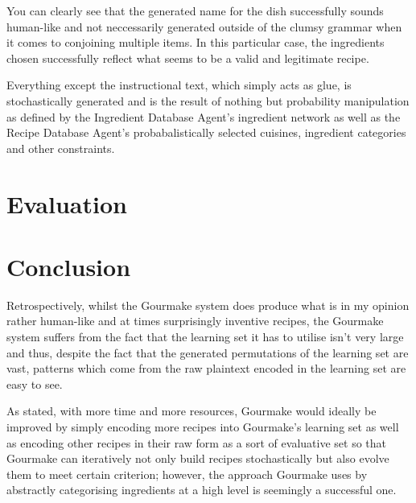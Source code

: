 \documentclass[9pt,titlepage,a4paper]{extarticle}
\newcommand\blankpage{%
    \null
    \thispagestyle{empty}%
    \addtocounter{page}{-1}%
    \newpage}
\begin{document}
    You can clearly see that the generated name for the dish successfully sounds human-like and not neccessarily generated
    outside of the clumsy grammar when it comes to conjoining multiple items. In this particular case, the ingredients chosen
    successfully reflect what seems to be a valid and legitimate recipe.

    Everything except the instructional text, which simply acts as glue, is stochastically generated and is the result
    of nothing but probability manipulation as defined by the Ingredient Database Agent's ingredient network as well as
    the Recipe Database Agent's probabalistically selected cuisines, ingredient categories and other constraints.

\section{Evaluation}

\section{Conclusion}
    Retrospectively, whilst the Gourmake system does produce what is in my opinion rather human-like and at times surprisingly
    inventive recipes, the Gourmake system suffers from the fact that the learning set it has to utilise isn't very large and
    thus, despite the fact that the generated permutations of the learning set are vast, patterns which come from the raw
    plaintext encoded in the learning set are easy to see.

    As stated, with more time and more resources, Gourmake would ideally be improved by simply encoding more recipes into Gourmake's
    learning set as well as encoding other recipes in their raw form as a sort of evaluative set so that Gourmake can iteratively
    not only build recipes stochastically but also evolve them to meet certain criterion; however, the approach Gourmake uses by
    abstractly categorising ingredients at a high level is seemingly a successful one.


%

\blankpage
\end{document}
